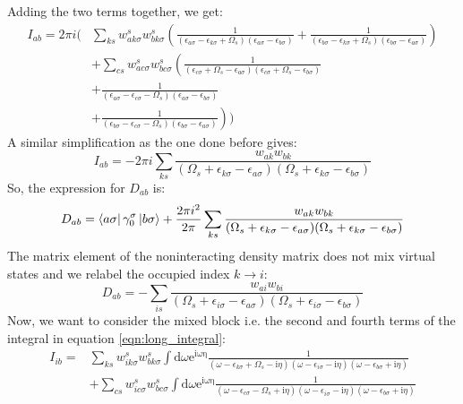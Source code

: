 \documentclass[12pt]{article}
\begin{document}
Adding the two terms together, we get:
\begin{equation}
\begin{aligned}
I_{ab} = 2\pi i \Bigg( & \sum_{ks} w_{a k \sigma}^s w_{b k \sigma}^s \left( \frac{1}{(\epsilon_{a \sigma} -\epsilon_{k \sigma}+\Omega_s)(\epsilon_{a \sigma} -\epsilon_{b \sigma})} + \frac{1}{(\epsilon_{b \sigma} -\epsilon_{k \sigma}+\Omega_s)(\epsilon_{b \sigma} -\epsilon_{a \sigma})} \right) \\
& + \sum_{cs} w_{a c \sigma}^s w_{b c \sigma}^s \left( \frac{1}{(\epsilon_{c \sigma} + \Omega_s -\epsilon_{a \sigma})(\epsilon_{c \sigma} + \Omega_s -\epsilon_{b \sigma})} \right. \\
& \left. + \frac{1}{(\epsilon_{a \sigma} -\epsilon_{c \sigma}-\Omega_s)(\epsilon_{a \sigma} -\epsilon_{b \sigma})} \right. \\
& \left. + \frac{1}{(\epsilon_{b \sigma} -\epsilon_{c \sigma}-\Omega_s)(\epsilon_{b \sigma} -\epsilon_{a \sigma})} \right) \Bigg)
\end{aligned}
\end{equation}
A similar simplification as the one done before gives:
\begin{equation}
I_{ab} = -2\pi i \sum_{ks}\frac{w_{ak} w_{bk}}{(\Omega_s + \epsilon_{k \sigma} - \epsilon_{a \sigma})(\Omega_s + \epsilon_{k \sigma} - \epsilon_{b \sigma})}
\end{equation}
So, the expression for $D_{ab}$ is:
\begin{equation}
D_{ab} = \bra{a\sigma } \gamma _0^\sigma \ket{b\sigma } + \frac{2\pi i^2}{2\pi} \sum_{ks}\frac{w_{ak} w_{bk}}{(\Omega_s + \epsilon_{k \sigma} - \epsilon_{a \sigma})(\Omega_s + \epsilon_{k \sigma} - \epsilon_{b \sigma})}
\end{equation}
The matrix element of the noninteracting density matrix does not mix virtual states and we relabel the occupied index $k\rightarrow i$:
\begin{equation}
D_{ab} = - \sum_{is}\frac{w_{ai} w_{bi}}{(\Omega_s + \epsilon_{i \sigma} - \epsilon_{a \sigma})(\Omega_s + \epsilon_{i \sigma} - \epsilon_{b \sigma})}
\end{equation}
Now, we want to consider the mixed block i.e. the second and fourth terms of the integral in equation \ref{eqn:long_integral}:
\begin{equation}
\begin{aligned}
I_{ib} =& \sum_{ks} w_{i k \sigma}^s w_{b k \sigma}^s \int \mathrm{d} \omega \mathrm{e}^{\mathrm{i \omega \eta}} \frac{1}{(\omega-\epsilon_{k \sigma}+\Omega_s-\mathrm{i} \eta)(\omega-\epsilon_{i \sigma}-\mathrm{i} \eta)(\omega-\epsilon_{b \sigma}+\mathrm{i} \eta)}\\
& + \sum_{cs} w_{i c \sigma}^s w_{b c \sigma}^s \int \mathrm{d} \omega \mathrm{e}^{\mathrm{i \omega \eta}} \frac{1}{(\omega-\epsilon_{c \sigma}-\Omega_s+\mathrm{i} \eta)(\omega-\epsilon_{i \sigma}-\mathrm{i} \eta)(\omega-\epsilon_{b \sigma}+\mathrm{i} \eta)}
\end{aligned}
\end{equation}
\end{document}
